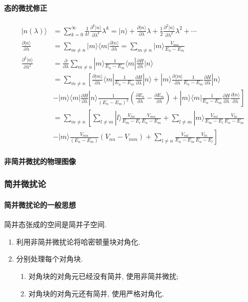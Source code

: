 \documentclass[../../main.tex]{subfiles}
\begin{document}
\paragraph{态的微扰修正}
\begin{align*}
    |n(\lambda)\rangle &= \sum_{k=0}^{\infty}\frac{1}{k!}\frac{\partial^{k}|n\rangle}{\partial\lambda^{k}}\lambda^{k} = |n\rangle + \frac{\partial|n\rangle}{\partial\lambda}\lambda + \frac{1}{2}\frac{\partial^{2}|n\rangle}{\partial\lambda^{2}}\lambda^{2} + \cdots\\
    \frac{\partial|n\rangle}{\partial\lambda} &= \sum_{m\neq n}|m\rangle\langle m|\frac{\partial|n\rangle}{\partial\lambda} = \sum_{m\neq n}|m\rangle \frac{V_{mn}}{E_{n} - E_{m}}\\
    \frac{\partial^{2}|n\rangle}{\partial\lambda^{2}} &= \frac{\partial}{\partial\lambda}\sum_{m\neq n}|m\rangle\frac{1}{E_{n}-E_{m}}\langle m|\frac{\partial H}{\partial\lambda}|n\rangle\\
    &= \sum_{m\neq n}\left[
        \frac{\partial|m\rangle}{\partial\lambda}\langle m|\frac{1}{E_{n}-E_{m}}\frac{\partial H}{\partial\lambda}|n\rangle 
        + |m\rangle\frac{\partial\langle m|}{\partial\lambda}\frac{1}{E_{n}-E_{m}}\frac{\partial H}{\partial\lambda}|n\rangle\right.\\
    &\left. - |m\rangle\langle m|\frac{\partial H}{\partial\lambda}|n\rangle\frac{1}{(E_{n}-E_{m})^{2}}\left(\frac{\partial E_{n}}{\partial\lambda} - \frac{\partial E_{m}}{\partial\lambda}\right) + |m\rangle\langle m|\frac{1}{E_{n}-E_{m}}\frac{\partial H}{\partial\lambda}\frac{\partial|n\rangle}{\partial\lambda}\right]\\
    &= \sum_{m\neq n}\left[
        \sum_{l\neq m}|l\rangle\frac{V_{lm}}{E_{m}-E_{l}}\frac{V_{mn}}{E_{n}-E_{m}} + \sum_{l\neq m}|m\rangle\frac{V_{ml}}{E_{m}-E_{l}}\frac{V_{ln}}{E_{n}-E_{m}}\right.\\
    &\left.- |m\rangle\frac{V_{mn}}{(E_{n}-E_{m})}(V_{nn}-V_{mm}) + \sum_{l\neq n}\frac{V_{ml}}{E_{n}-E_{m}}\frac{V_{ln}}{E_{n}-E_{l}}\right]
\end{align*}
\paragraph{非简并微扰的物理图像}
\subsubsection{简并微扰论}
\paragraph{简并微扰论的一般思想}
简并态张成的空间是简并子空间.
\begin{enumerate}
    \item 利用非简并微扰论将哈密顿量块对角化.
    \item 分别处理每个对角块.
    \begin{enumerate}
        \item 对角块的对角元已经没有简并, 使用非简并微扰;
        \item 对角块的对角元还有简并, 使用严格对角化.
    \end{enumerate}
\end{enumerate}
\end{document}
